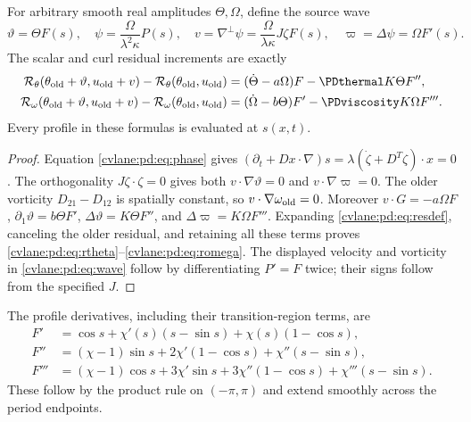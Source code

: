 \begin{cvlanepdproposition}\label{cvlane:pd:prop:res}
For arbitrary smooth real amplitudes $\Theta,\Omega$, define the source wave
\begin{equation}\label{cvlane:pd:eq:wave}
 \vartheta=\Theta F(s),\quad
 \psi=\frac{\Omega}{\lambda^2\kappa}P(s),\quad
 v=\nabla^\perp\psi=\frac{\Omega}{\lambda\kappa}J\zeta F(s),\quad
 \varpi=\Delta\psi=\Omega F'(s).
\end{equation}
The scalar and curl residual increments are exactly
\begin{align}
 \mathcal R_\theta(\theta_{\rm old}+\vartheta,u_{\rm old}+v)
  -\mathcal R_\theta(\theta_{\rm old},u_{\rm old})
   &=(\dot\Theta-a\Omega)F-\PDthermal K\Theta F'',\label{cvlane:pd:eq:rtheta}\\
 \mathcal R_\omega(\theta_{\rm old}+\vartheta,u_{\rm old}+v)
  -\mathcal R_\omega(\theta_{\rm old},u_{\rm old})
   &=(\dot\Omega-b\Theta)F'-\PDviscosity K\Omega F'''.\label{cvlane:pd:eq:romega}
\end{align}
Every profile in these formulas is evaluated at $s(x,t)$.
\end{cvlanepdproposition}
\begin{proof}
Equation \eqref{cvlane:pd:eq:phase} gives
$(\partial_t+Dx\cdot\nabla)s=
\lambda(\dot\zeta+D^T\zeta)\cdot x=0$.
The orthogonality $J\zeta\cdot\zeta=0$ gives both
$v\cdot\nabla\vartheta=0$ and $v\cdot\nabla\varpi=0$.
The older vorticity $D_{21}-D_{12}$ is spatially constant, so
$v\cdot\nabla\omega_{\rm old}=0$.
Moreover $v\cdot G=-a\Omega F$,
$\partial_1\vartheta=b\Theta F'$,
$\Delta\vartheta=K\Theta F''$, and
$\Delta\varpi=K\Omega F'''$.
Expanding \eqref{cvlane:pd:eq:resdef}, canceling the older residual, and retaining all
these terms proves \eqref{cvlane:pd:eq:rtheta}--\eqref{cvlane:pd:eq:romega}.
The displayed velocity and vorticity in \eqref{cvlane:pd:eq:wave} follow by
differentiating $P'=F$ twice; their signs follow from the specified $J$.
\end{proof}

The profile derivatives, including their transition-region terms, are
\begin{align}
 F'&=\cos s+\chi'(s)(s-\sin s)+\chi(s)(1-\cos s),\label{cvlane:pd:eq:dF}\\
 F''&=(\chi-1)\sin s+2\chi'(1-\cos s)+\chi''(s-\sin s),\label{cvlane:pd:eq:ddF}\\
 F'''&=(\chi-1)\cos s+3\chi'\sin s
              +3\chi''(1-\cos s)+\chi'''(s-\sin s).\label{cvlane:pd:eq:dddF}
\end{align}
These follow by the product rule on $(-\pi,\pi)$ and extend smoothly
across the period endpoints.

